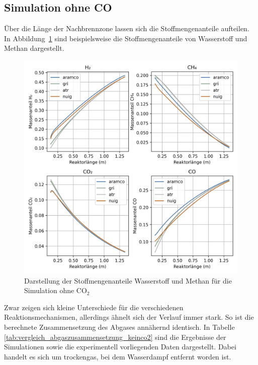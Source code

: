 \documentclass[footmark=none]{tubaf-thesis}
\begin{document}
        \subsection{Simulation ohne CO }
        Über die Länge der Nachbrennzone lassen sich die Stoffmengenanteile aufteilen. In Abbildung~\ref{fig:vergleich_h2_ch4_keinco2} sind beispielsweise die Stoffmengenanteile von Wasserstoff und Methan dargestellt.
        \begin{figure}[H]
            \centering
            \includegraphics[width=0.9\linewidth]{img_py/H2_CH4_CO_CO2_keinCO2.png}
            \caption{Darstellung der Stoffmengenanteile Wasserstoff und Methan für die Simulation ohne CO$_2$}
            \label{fig:vergleich_h2_ch4_keinco2}
        \end{figure}
        Zwar zeigen sich kleine Unterschiede für die verschiedenen Reaktionsmechanismen, allerdings ähnelt sich der Verlauf immer stark. So ist die berechnete Zusammensetzung des Abgases annähernd identisch. In Tabelle \ref{tab:vergleich_abgaszusammensetzung_keinco2} sind die Ergebnisse der Simulationen sowie die experimentell vorliegenden Daten dargestellt. Dabei handelt es sich um trockengas, bei dem Wasserdampf entfernt worden ist. 
\end{document}
